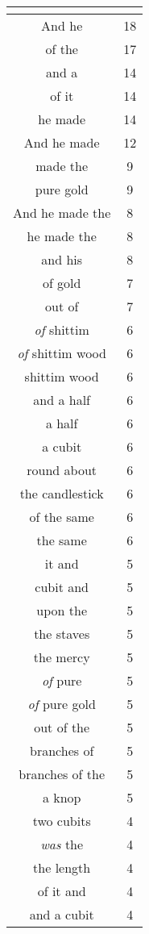 \begin{center}
\begin{longtable}{|c|c|}
\hline \multicolumn{2}{c}{{ }} \\ \hline
\endfoot 
And he & 18\\ \hline 
of the & 17\\ \hline 
and a & 14\\ \hline 
of it & 14\\ \hline 
he made & 14\\ \hline 
And he made & 12\\ \hline 
made the & 9\\ \hline 
pure gold & 9\\ \hline 
And he made the & 8\\ \hline 
he made the & 8\\ \hline 
and his & 8\\ \hline 
of gold & 7\\ \hline 
out of & 7\\ \hline 
\emph{of} shittim & 6\\ \hline 
\emph{of} shittim wood & 6\\ \hline 
shittim wood & 6\\ \hline 
and a half & 6\\ \hline 
a half & 6\\ \hline 
a cubit & 6\\ \hline 
round about & 6\\ \hline 
the candlestick & 6\\ \hline 
of the same & 6\\ \hline 
the same & 6\\ \hline 
it and & 5\\ \hline 
cubit and & 5\\ \hline 
upon the & 5\\ \hline 
the staves & 5\\ \hline 
the mercy & 5\\ \hline 
\emph{of} pure & 5\\ \hline 
\emph{of} pure gold & 5\\ \hline 
out of the & 5\\ \hline 
branches of & 5\\ \hline 
branches of the & 5\\ \hline 
a knop & 5\\ \hline 
two cubits & 4\\ \hline 
\emph{was} the & 4\\ \hline 
the length & 4\\ \hline 
of it and & 4\\ \hline 
and a cubit & 4\\ \hline 

\end{longtable}
\end{center}
